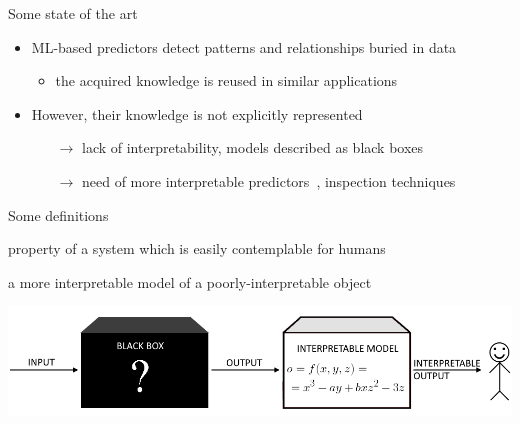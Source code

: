 \documentclass[presentation]{beamer}
\begin{document}
\begin{frame}[allowframebreaks]{Some state of the art}
	
    \begin{itemize}
    	\item ML-based predictors detect patterns and relationships buried in data
    	\begin{itemize}
    		\item the acquired knowledge is reused in similar applications
    	\end{itemize}
    
    	\bigskip
    
    	\item However, their knowledge is not explicitly represented
    	\begin{itemize}
    		\item[$\rightarrow$] lack of interpretability, models described as black boxes~
    		\item[$\rightarrow$] need of more interpretable predictors~, inspection techniques~    		
    	\end{itemize}
    \end{itemize}

	\framebreak %

	\begin{block}{Some definitions~}
		\begin{description}\small
			\item[interpretability] property of a system which is easily contemplable for humans  
			\item[explanation] a more interpretable model of a poorly-interpretable object
		\end{description}
	\end{block}

	\vspace{25px}
	\centering
	\includegraphics[width=.9\linewidth]{img/wb.png}	


\end{frame}
\end{document}
